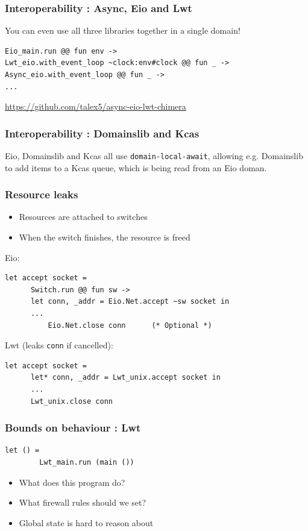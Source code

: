 \documentclass{beamer}
\begin{document}
\begin{frame}[fragile]
	\frametitle{Interoperability : Async, Eio and Lwt}
	You can even use all three libraries together in a single domain!
	\bigskip
\begin{lstlisting}[style=ocaml]
Eio_main.run @@ fun env ->
Lwt_eio.with_event_loop ~clock:env#clock @@ fun _ ->
Async_eio.with_event_loop @@ fun _ ->
...
\end{lstlisting}
	\bigskip
	\url{https://github.com/talex5/async-eio-lwt-chimera}
\end{frame}

\begin{frame}[fragile]
	\frametitle{Interoperability : Domainslib and Kcas}
	Eio, Domainslib and Kcas all use \verb|domain-local-await|,
	allowing e.g. Domainslib to add items to a Kcas queue,
	which is being read from an Eio doman.
\end{frame}


\begin{frame}[fragile]
	\frametitle{Resource leaks}
	\begin{itemize}
		\item Resources are attached to switches
		\item When the switch finishes, the resource is freed
	\end{itemize}
	Eio:
	\begin{lstlisting}[style=ocaml]
	let accept socket =
	  Switch.run @@ fun sw ->
	  let conn, _addr = Eio.Net.accept ~sw socket in
	  ...
          Eio.Net.close conn      (* Optional *)
	\end{lstlisting}
        Lwt (leaks \verb|conn| if cancelled):
	\begin{lstlisting}[style=ocaml]
	let accept socket =
	  let* conn, _addr = Lwt_unix.accept socket in
	  ...
	  Lwt_unix.close conn
	\end{lstlisting}
\end{frame}

\begin{frame}[fragile]
	\frametitle{Bounds on behaviour : Lwt}

	\begin{lstlisting}[style=ocaml]
	      let () =
		Lwt_main.run (main ())
	\end{lstlisting}

	\begin{itemize}
		\item What does this program do?
		\item What firewall rules should we set?
		\item Global state is hard to reason about
	\end{itemize}
\end{frame}
\end{document}
